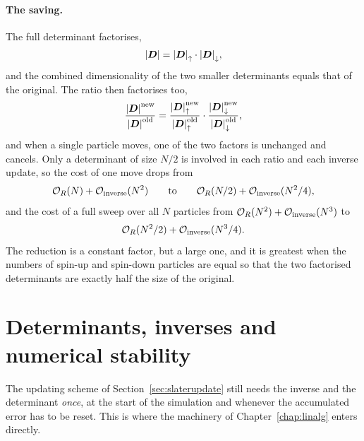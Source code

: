 \paragraph{The saving.}
The full determinant factorises,
\begin{equation}
  {|\boldsymbol{D}|} = {|\boldsymbol{D}|}_{\uparrow}\cdot{|\boldsymbol{D}|}_{\downarrow} ,
  \label{eq:2-detfactorises}
\end{equation}
and the combined dimensionality of the two smaller determinants equals that of
the original.  The ratio then factorises too,
\begin{equation}
  \frac{{|\boldsymbol{D}|}^{\mathrm{new}}}{{|\boldsymbol{D}|}^{\mathrm{old}}}
   = \frac{{|\boldsymbol{D}|}_{\uparrow}^{\mathrm{new}}}
          {{|\boldsymbol{D}|}_{\uparrow}^{\mathrm{old}}}\cdot
     \frac{{|\boldsymbol{D}|}_{\downarrow}^{\mathrm{new}}}
          {{|\boldsymbol{D}|}_{\downarrow}^{\mathrm{old}}} ,
  \label{eq:2-ratiofactorises}
\end{equation}
and when a single particle moves, one of the two factors is unchanged and
cancels.  Only a determinant of size $N/2$ is involved in each ratio and each
inverse update, so the cost of one move drops from
\begin{equation}
  \mathcal{O}_R(N)+\mathcal{O}_{\mathrm{inverse}}(N^2)
  \qquad\text{to}\qquad
  \mathcal{O}_R(N/2)+\mathcal{O}_{\mathrm{inverse}}(N^2/4),
  \label{eq:2-spincount1}
\end{equation}
and the cost of a full sweep over all $N$ particles from
$\mathcal{O}_R(N^2)+\mathcal{O}_{\mathrm{inverse}}(N^3)$ to
\begin{equation}
  \mathcal{O}_R(N^2/2)+\mathcal{O}_{\mathrm{inverse}}(N^3/4).
  \label{eq:2-spincount2}
\end{equation}
The reduction is a constant factor, but a large one, and it is greatest when
the numbers of spin-up and spin-down particles are equal so that the two
factorised determinants are exactly half the size of the original.

\section{Determinants, inverses and numerical stability}
\label{sec:slaterstability}

The updating scheme of Section~\ref{sec:slaterupdate} still needs the inverse
and the determinant \emph{once}, at the start of the simulation and whenever
the accumulated error has to be reset.  This is where the machinery of
Chapter~\ref{chap:linalg} enters directly.

